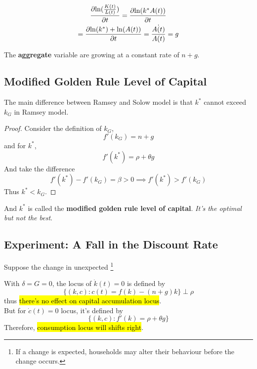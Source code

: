 \documentclass[]{article}
\begin{document}
			\begin{example}
				\begin{gather*}
					\frac{\partial{\ln(\frac{K(t)}{L(t)})}}{\partial{t}} = \frac{\partial{\ln(k^*A(t))}}{\partial{t}} \\
					= \frac{\partial{\ln(k^*) + \ln(A(t))}}{\partial{t}} = \frac{\dot{A(t)}}{A(t)} = g
				\end{gather*}
			\end{example}
			The \textbf{aggregate} variable are growing at a constant rate of $n+g$.
			
		\subsection{Modified Golden Rule Level of Capital}
			\par The main difference between Ramsey and Solow model is that $k^*$ cannot exceed $k_G$ in Ramsey model.
			\begin{proof}
				Consider the definition of $k_G$, 
				\[
					f'(k_G) = n + g
				\]
				and for $k^*$,
				\[
					f'(k^*) = \rho + \theta g
				\]
				And take the difference 
				\[
					f'(k^*) - f'(k_G) = \beta > 0 \implies f'(k^*) > f'(k_G)
				\]
				Thus $k^* < k_G$.
			\end{proof}
			And $k^*$ is called the \textbf{modified golden rule level of capital}. \emph{It's the optimal but not the best}.
		
		\subsection{Experiment: A Fall in the Discount Rate}
			\begin{assumption}
				Suppose the change in unexpected \footnote{If a change is expected, households may alter their behaviour before the change occurs.}
			\end{assumption}
			\begin{remark}
				With $\delta = G = 0$, the locus of $\dot{k}(t) = 0$ is defined by
				\[
					\{(k, c):c(t) = f(k) - (n+g)k\} \perp \rho
				\]
				thus \hl{there's no effect on capital accumulation locus}.\\
				But for $\dot{c}(t)=0$ locus, it's defined by
				\[
					\{(k,c): f'(k) = \rho + \theta g\}
				\]
				Therefore, \hl{consumption locus will shifts right}.
			\end{remark}
\end{document}
